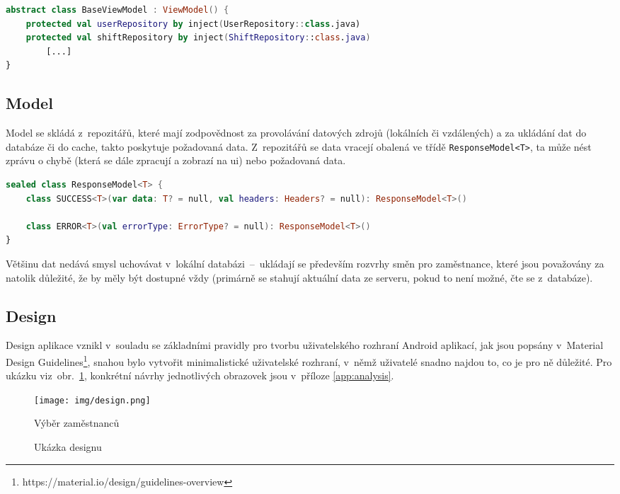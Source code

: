 \documentclass[twoside]{ctuthesis}
\begin{document}
\begin{lstlisting}[language=Kotlin,caption={Třída \texttt{BaseViewModel}},label={lst:viewmodel}]
abstract class BaseViewModel : ViewModel() {
    protected val userRepository by inject(UserRepository::class.java)
    protected val shiftRepository by inject(ShiftRepository::class.java)
		[...]
}
\end{lstlisting}

\subsection{Model}
Model se skládá z~repozitářů, které mají zodpovědnost za provolávání datových zdrojů (lokálních či vzdálených) a za ukládání dat do databáze či do cache, takto poskytuje požadovaná data. Z~repozitářů se data vracejí obalená ve třídě \texttt{ResponseModel<T>}, ta může nést zprávu o chybě (která se dále zpracují a zobrazí na \acrshort{ui}) nebo požadovaná data.

\begin{lstlisting}[language=Kotlin,caption={Třída \texttt{ResponseModel}},label={lst:responsemodel}]
sealed class ResponseModel<T> {
	class SUCCESS<T>(var data: T? = null, val headers: Headers? = null): ResponseModel<T>()

	class ERROR<T>(val errorType: ErrorType? = null): ResponseModel<T>()
}
\end{lstlisting}

Většinu dat nedává smysl uchovávat v~lokální databázi~–~ukládají se především rozvrhy směn pro zaměstnance, které jsou považovány za natolik důležité, že by měly být dostupné vždy (primárně se stahují aktuální data ze serveru, pokud to není možné, čte se z~databáze).

\subsection{Design}\label{design}

Design aplikace vznikl v~souladu se základními pravidly pro tvorbu uživatelského rozhraní Android aplikací, jak jsou popsány v~Material Design Guidelines\footnote{https://material.io/design/guidelines-overview}, snahou bylo vytvořit minimalistické uživatelské rozhraní, v~němž uživatelé snadno najdou to, co je pro ně důležité. Pro ukázku viz~obr.~\ref{fig:design}, konkrétní návrhy jednotlivých obrazovek jsou v~příloze \ref{app:analysis}.

\begin{figure}[h]
	\texttt{[image: img/design.png]}
	\caption{Výběr zaměstnanců}
	\label{fig:design}
\caption{Ukázka designu}
\end{figure}
\end{document}
